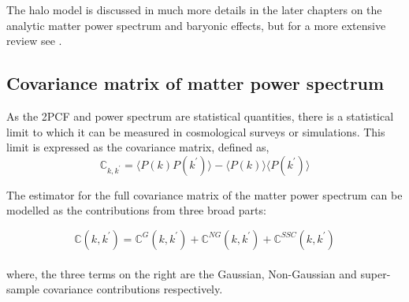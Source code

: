 \documentclass[
  11pt,
  twoside,
  openright,
  titlepage,
  headings=optiontoheadandtoc
]{scrbook}
\begin{document}
The halo model is discussed in much more details in the later chapters
on the analytic matter power spectrum and baryonic effects, but for a more extensive review see
\cite{2002PhR...372....1C}.


\subsection{Covariance matrix of matter power spectrum}
As the 2PCF and power spectrum are statistical quantities, there is a statistical limit
to which it can be measured in cosmological surveys or simulations. This limit is expressed
as the covariance matrix, defined as,
\begin{equation}
	\mathbb{C}_{k,k^{\prime}}	= 
			\langle P(k)P(k^{\prime}) \rangle - 
			\langle P(k)\rangle \langle P(k^{\prime})\rangle
\end{equation}

The estimator for the full covariance matrix of the matter power spectrum 
can be modelled as the contributions from three broad parts:

\begin{equation}
	\mathbb{C}(k,k^{\prime}) = \mathbb{C}^{G}(k,k^{\prime}) + 
								\mathbb{C}^{NG}(k,k^{\prime}) + 
								\mathbb{C}^{SSC}(k,k^{\prime})
\end{equation}
\\
where, the three terms on the right are the Gaussian, Non-Gaussian and 
super-sample covariance contributions respectively. 
\end{document}

